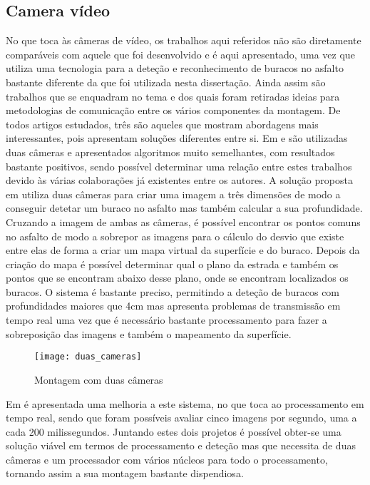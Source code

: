 \subsection{Camera vídeo}
\label{subsec: camera_video}
No que toca às câmeras de vídeo, os trabalhos aqui referidos não são diretamente comparáveis com aquele que foi desenvolvido e é aqui apresentado, uma vez que utiliza uma tecnologia para a deteção e reconhecimento de buracos no asfalto bastante diferente da que foi utilizada nesta dissertação.
Ainda assim são trabalhos que se enquadram no tema e dos quais foram retiradas ideias para metodologias de comunicação entre os vários componentes da montagem.
De todos artigos estudados, três são aqueles que mostram abordagens mais interessantes, pois apresentam soluções diferentes entre si.
Em \cite{Zhang} e \cite{Chan2014} são utilizadas duas câmeras e apresentados algoritmos muito semelhantes, com resultados bastante positivos, sendo possível determinar uma relação entre estes trabalhos devido às várias colaborações já existentes entre os autores.
A solução proposta em \cite{Zhang} utiliza duas câmeras para criar uma imagem a três dimensões de modo a conseguir detetar um buraco no asfalto mas também calcular a sua profundidade.
Cruzando a imagem de ambas as câmeras, é possível encontrar os pontos comuns no asfalto de modo a sobrepor as imagens para o cálculo do desvio que existe entre elas de forma a criar um mapa virtual da superfície e do buraco.
Depois da criação do mapa é possível determinar qual o plano da estrada e também os pontos que se encontram abaixo desse plano, onde se encontram localizados os buracos.
O sistema é bastante preciso, permitindo a deteção de buracos com profundidades maiores que 4cm mas apresenta problemas de transmissão em tempo real uma vez que é necessário bastante processamento para fazer a sobreposição das imagens e também o mapeamento da superfície.

\begin{figure}[htbp]
	\centering
	\texttt{[image: duas\_cameras]}
	\caption{Montagem com duas câmeras}
	\label{fig:montagem_com_duas_cameras}
\end{figure}

Em \cite{Chan2014} é apresentada uma melhoria a este sistema, no que toca ao processamento em tempo real, sendo que foram possíveis avaliar cinco imagens por segundo, uma a cada 200 milissegundos.
Juntando estes dois projetos é possível obter-se uma solução viável em termos de processamento e deteção mas que necessita de duas câmeras e um processador com vários núcleos para todo o processamento, tornando assim a sua montagem bastante dispendiosa.

